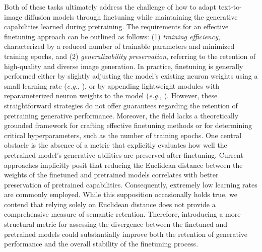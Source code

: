 Both of these tasks ultimately address the challenge of how to adapt text-to-image diffusion models through finetuning while maintaining the generative capabilities learned during pretraining. The requirements for an effective finetuning approach can be outlined as follows: (1) \emph{training efficiency}, characterized by a reduced number of trainable parameters and minimized training epochs, and (2) \emph{generalizability preservation}, referring to the retention of high-quality and diverse image generation. In practice, finetuning is generally performed either by slightly adjusting the model’s existing neuron weights using a small learning rate (\emph{e.g.}, \cite{ruiz2023dreambooth}), or by appending lightweight modules with reparameterized neuron weights to the model (\emph{e.g.}, \cite{hulora2022,zhang2023adding}). However, these straightforward strategies do not offer guarantees regarding the retention of pretraining generative performance. Moreover, the field lacks a theoretically grounded framework for crafting effective finetuning methods or for determining critical hyperparameters, such as the number of training epochs. One central obstacle is the absence of a metric that explicitly evaluates how well the pretrained model’s generative abilities are preserved after finetuning. Current approaches implicitly posit that reducing the Euclidean distance between the weights of the finetuned and pretrained models correlates with better preservation of pretrained capabilities. Consequently, extremely low learning rates are commonly employed. While this supposition occasionally holds true, we contend that relying solely on Euclidean distance does not provide a comprehensive measure of semantic retention. Therefore, introducing a more structural metric for assessing the divergence between the finetuned and pretrained models could substantially improve both the retention of generative performance and the overall stability of the finetuning process.

